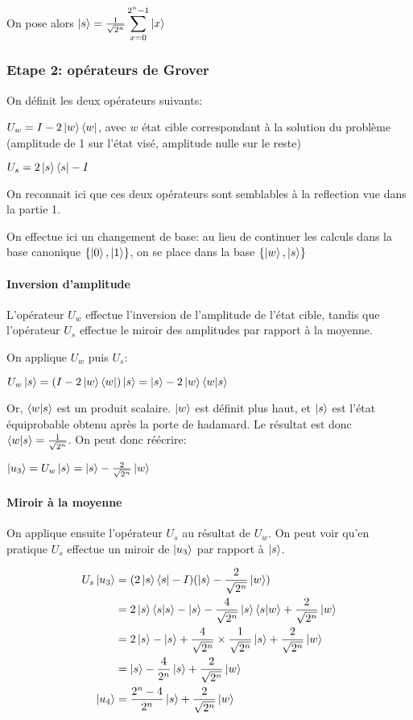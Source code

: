 On pose alors $\ket{s} = \frac{1}{\sqrt{2^n}} \displaystyle\sum_{x=0}^{2^n-1} \ket{x}$

\subsubsection*{Etape 2: opérateurs de Grover}

On définit les deux opérateurs suivants:

$U_w = I - 2\ket{w}\bra{w}$, avec $w$ état cible correspondant à la solution du problème (amplitude de 1 sur l'état visé, amplitude nulle sur le reste)

$U_s = 2\ket{s}\bra{s} - I$

\begin{rem}
    On reconnait ici que ces deux opérateurs sont semblables à la reflection vue dans la partie 1.
\end{rem}

\medbreak
On effectue ici un changement de base: au lieu de continuer les calculs dans la base canonique $\{\ket{0}, \ket{1}\}$, on se place dans la base $\{\ket{w}, \ket{s}\}$

\paragraph*{Inversion d'amplitude}

L'opérateur $U_w$ effectue l'inversion de l'amplitude de l'état cible, tandis que l'opérateur $U_s$ effectue le miroir des amplitudes par rapport à la moyenne.

On applique $U_w$ puis $U_s$:

$U_w \ket{s} = (I - 2 \ket{w}\bra{w})\ket{s} \nonumber = \ket{s} - 2 \ket{w}\braket{w|s}$

Or, $\braket{w|s}$ est un produit scalaire. $\ket{w}$ est définit plus haut, et $\ket{s}$ est l'état équiprobable obtenu après la porte de hadamard. Le résultat est donc $\braket{w|s} = \frac{1}{\sqrt{2^n}}$. On peut donc réécrire:

$\ket{u_3} = U_w \ket{s} = \ket{s} - \frac{2}{\sqrt{2^n}}\ket{w}$

\paragraph*{Miroir à la moyenne}
On applique ensuite l'opérateur $U_s$ au résultat de $U_w$. On peut voir qu'en pratique $U_s$ effectue un miroir de $\ket{u_3}$ par rapport à $\ket{s}$.

\begin{align}
  U_s\ket{u_3} 
  &= (2\ket{s}\bra{s} - I)(\ket{s} - \frac{2}{\sqrt{2^n}}\ket{w}) \nonumber \\
  &= 2\ket{s}\braket{s|s} - \ket{s} - \frac{4}{\sqrt{2^n}} \ket{s} \braket{s|w} + \frac{2}{\sqrt{2^n}}\ket{w} \nonumber \\
  &= 2\ket{s} - \ket{s} + \frac{4}{\sqrt{2^n}} \times \frac{1}{\sqrt{2^n}} \ket{s} + \frac{2}{\sqrt{2^n}}\ket{w} \nonumber \\
  &= \ket{s} - \frac{4}{2^n} \ket{s} + \frac{2}{\sqrt{2^n}}\ket{w} \nonumber \\
  \ket{u_4}&=\frac{2^n - 4}{2^n}\ket{s} + \frac{2}{\sqrt{2^n}}\ket{w}
\end{align}

